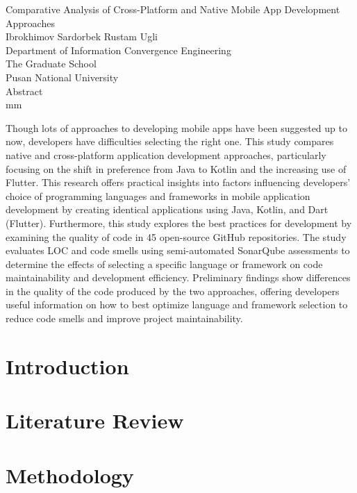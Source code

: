 \documentclass[11pt,jaso]{pnumasterh}
\begin{document}
\newpage
\thispagestyle{empty}
\begin{center}
    \vskip 3.5cm
    {\Large{Comparative Analysis of Cross-Platform and Native Mobile App Development Approaches}} \\
    \vskip 15mm
    {\large{Ibrokhimov Sardorbek Rustam Ugli}} \\
    \vskip 10mm
    {Department of Information Convergence Engineering} \\
    {The Graduate School} \\
    {Pusan National University} \\
    \vskip 15mm
    {\large{Abstract}}\\
     mm
\end{center}
Though lots of approaches to developing mobile apps have been suggested up to now, developers have difficulties selecting the right one. This study compares native and cross-platform application development approaches, particularly focusing on the shift in preference from Java to Kotlin and the increasing use of Flutter. This research offers practical insights into factors influencing developers’ choice of programming languages and frameworks in mobile application development by creating identical applications using Java, Kotlin, and Dart (Flutter). Furthermore, this study explores the best practices for development by examining the quality of code in 45 open-source GitHub repositories. The study evaluates LOC and code smells using semi-automated SonarQube assessments to determine the effects of selecting a specific language or framework on code maintainability and development efficiency. Preliminary findings show differences in the quality of the code produced by the two approaches, offering developers useful information on how to best optimize language and framework selection to reduce code smells and improve project maintainability.    
\newpage
{}

\section{Introduction}

\clearpage

\section{Literature Review} \label{literature_review}

\clearpage

\section{Methodology}

\clearpage
\end{document}
